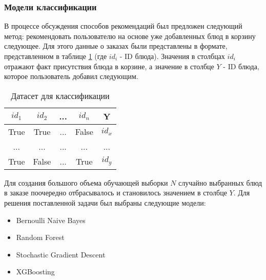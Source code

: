\subsubsection{Модели классификации}
В процессе обсуждения способов рекомендаций был предложен следующий метод: рекомендовать
пользователю на основе уже добавленных блюд в корзину следующее. Для этого данные о заказах были
представлены в формате, представленном в таблице \ref{table:1} (где $id_i$ - ID блюда).
Значения в столбцах $id_i$ отражают факт присутствия блюда в корзине, а значение в
столбце $Y$ - ID блюда, которое пользователь добавил следующим.
\begin{table}[H]
  \centering
  \begin{tabular} { | c | c | c | c | c | }
  \hline
  $id_1$ & $id_2$ & ... & $id_n$ & Y \\
  \hline
  True  & True  & ... & False & $id_x$ \\
  \hline
  ...  & ...  & ... & ... & ... \\
  \hline
  True  & False  & ... & True & $id_y$ \\
  \hline
  \end{tabular}
  \caption{Датасет для классификации}
  \label{table:1}
\end{table}
Для создания большого объема обучающей выборки $N$ случайно выбранных блюд в заказе
поочередно отбрасывалось и становилось значением в столбце $Y$. Для решения поставленной
задачи был выбраны следующие модели:
\begin{itemize}
  \item Bernoulli Naive Bayes
  \item Random Forest
  \item Stochastic Gradient Descent
  \item XGBoosting
\end{itemize}
